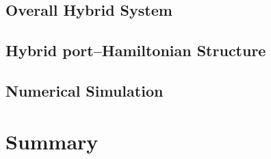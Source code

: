 \subsection{Overall Hybrid System}
\subsection{Hybrid port--Hamiltonian Structure}
\subsection{Numerical Simulation}
%

\section{Summary}
